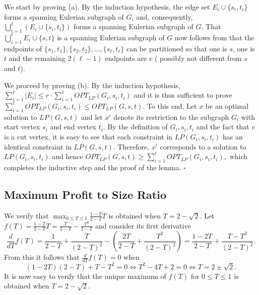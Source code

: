 \documentclass[letterpaper,11pt]{article}
\newenvironment{proof}{\begin{trivlist}
\item[\hskip\labelsep {\bf Proof}.]}{\QED \end{trivlist}}
\newcommand{\QED}{\hfill $\square$}
\newcommand{\LP}[1]{\ensuremath{LP(#1)}}
\newcommand{\OLP}[1]{\ensuremath{OPT_{LP}(#1)}}
\begin{document}
\begin{proof}
We start by proving (a). By the induction hypothesis, the edge set
$E_i \cup \{s_i, t_i\}$ forms a spanning Eulerian subgraph of $G_i$
and, consequently, $\bigcup_{i=1}^\ell \left(E_i \cup \{s_i,
  t_i\}\right)$ forms a spanning Eulerian subgraph of $G$.  That
$\bigcup_{i=1}^\ell E_i \cup \{s, t\}$ is a spanning Eulerian subgraph
of $G$ now follows from that the endpoints of $\{s_1,t_1\}, \{s_2,
t_2\}, \ldots, \{s_\ell, t_\ell\}$ can be partitioned so that one is $s$, one is $t$ and the
remaining $2(\ell-1)$ endpoints are $v$ ( possibly not different from
$s$ and $t$).

We proceed by proving (b).  By the induction hypothesis, $ \sum_{i=1}^\ell |E_i| \leq r \cdot \sum_{i=1}^\ell \OLP{G_i, s_i,
  t_i} $ and it is thus sufficient to prove $\sum_{i=1}^\ell \OLP{G_i,
  s_i, t_i} \leq \OLP{G,s,t}$.  To this end, Let $x$ be an optimal
solution to $\LP{G,s,t}$ and let $x^i$ denote its restriction to the
subgraph $G_i$ with start vertex $s_i$ and end vertex $t_i$.  By the
definition of $G_i, s_i, t_i$ and the fact that $v$ is a cut vertex,
it is easy to see that each constraint in $\LP{G_i, s_i, t_i}$ has an
identical constraint in $\LP{G,s,t}$. Therefore, $x^i$ corresponds to
a solution to \LP{G_i, s_i, t_i} and hence $\OLP{G,s,t} \geq
\sum_{i=1}^\ell \OLP{G_i,s_i,t_i}, $ which completes the inductive
step and the proof of the lemma.
\end{proof}

\subsection{Maximum Profit to Size Ratio}
\label{sec:maxsizratio}
We verify that $\max_{0\leq T\leq 1} \frac{1-T}{2-T} T$ is obtained
when $T= 2-\sqrt{2}$.  Let $f(T) = \frac{1-T}{2-T} T = \frac{T}{2-T} -
\frac{T^2}{2-T}$ and consider its first derivative
$$
\frac{d}{dT}f(T) = \frac{1}{2-T} + \frac{T}{(2-T)^2}  - \left(\frac{2T}{2-T} + \frac{T^2}{(2-T)^2}\right) = \frac{1-2T}{2-T} + \frac{T-T^2}{(2-T)^2}.
$$
From this it follows that $\frac{d}{dT}f(T) = 0$ when
$$
(1-2T)(2-T) + T-T^2 = 0 \Leftrightarrow T^2 - 4T + 2 = 0 \Leftrightarrow T = 2 \pm \sqrt{2}.
$$
It is now easy to verify that the unique maximum of $f(T)$ for $0\leq
T\leq 1$ is obtained when $T= 2-\sqrt{2}$.
\end{document}
